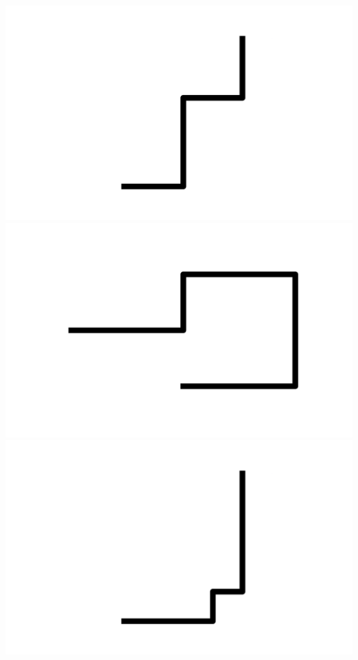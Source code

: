 \documentclass[]{report}
\begin{document}
\includegraphics[scale=.1]{pictures/21/state_cluster_shapes_331.pdf} 
\includegraphics[scale=.1]{pictures/21/state_cluster_shapes_332.pdf} 
\includegraphics[scale=.1]{pictures/21/state_cluster_shapes_333.pdf} 
\end{document}
